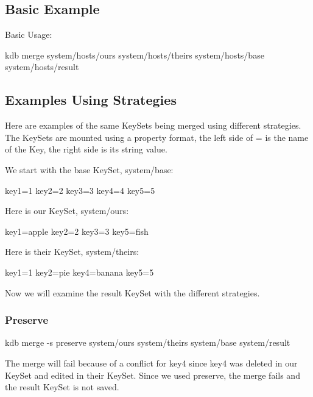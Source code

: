 \subsection*{Basic Example}

Basic Usage\+:


\begin{DoxyCode}
kdb merge system/hosts/ours system/hosts/theirs system/hosts/base system/hosts/result
\end{DoxyCode}


\subsection*{Examples Using Strategies}

Here are examples of the same Key\+Sets being merged using different strategies. The Key\+Sets are mounted using a property format, the left side of \textquotesingle{}=\textquotesingle{} is the name of the Key, the right side is its string value.

We start with the base Key\+Set, {\ttfamily system/base}\+: \begin{DoxyVerb}key1=1
key2=2
key3=3
key4=4
key5=5
\end{DoxyVerb}


Here is our Key\+Set, {\ttfamily system/ours}\+: \begin{DoxyVerb}key1=apple
key2=2
key3=3
key5=fish
\end{DoxyVerb}


Here is their Key\+Set, {\ttfamily system/theirs}\+: \begin{DoxyVerb}key1=1
key2=pie
key4=banana
key5=5
\end{DoxyVerb}


Now we will examine the result Key\+Set with the different strategies.

\subsubsection*{Preserve}


\begin{DoxyCode}
kdb merge -s preserve system/ours system/theirs system/base system/result
\end{DoxyCode}


The merge will fail because of a conflict for {\ttfamily key4} since {\ttfamily key4} was deleted in our Key\+Set and edited in their Key\+Set. Since we used preserve, the merge fails and the result Key\+Set is not saved.

